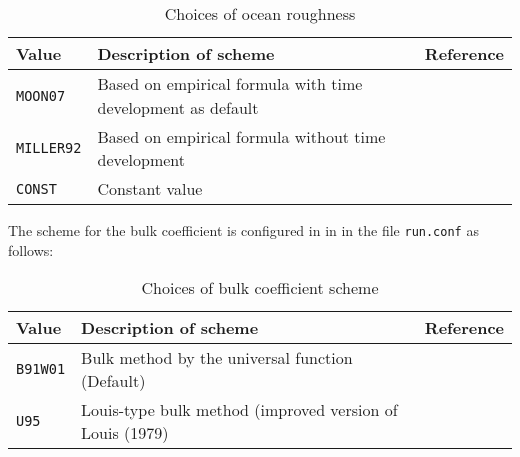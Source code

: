 \begin{table}[hbt]
\begin{center}
  \caption{Choices of ocean roughness}
  \label{tab:nml_roughness}
  \begin{tabularx}{150mm}{lXX} \hline
    \rowcolor[gray]{0.9}  Value & Description of scheme & Reference \\ \hline
      \verb|MOON07|   & Based on empirical formula with time development as default　& \citet{moon_2007} \\
      \verb|MILLER92| & Based on empirical formula without time development          & \citet{miller_1992} \\
      \verb|CONST|    & Constant value & \\
    \hline
  \end{tabularx}
\end{center}
\end{table}

The scheme for the bulk coefficient is configured in  in  in the file \verb|run.conf| as follows:

\begin{table}[h]
\begin{center}
  \caption{Choices of bulk coefficient scheme}
  \label{tab:nml_bulk}
  \begin{tabularx}{150mm}{llX} \hline
    \rowcolor[gray]{0.9}  Value & Description of scheme & Reference\\ \hline
      \verb|B91W01| & Bulk method by the universal function (Default) & \citet{beljaars_1991,wilson_2001} \\
      \verb|U95|    & Louis-type bulk method  (improved version of Louis (1979) & \citet{uno_1995} \\
    \hline
  \end{tabularx}
\end{center}
\end{table}

